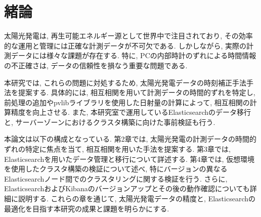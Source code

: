 \chapter{緒論}
\label{chap:first}

太陽光発電は, 再生可能エネルギー源として世界中で注目されており, その効率的な運用と管理には正確な計測データが不可欠である. しかしながら, 実際の計測データには様々な課題が存在する. 特に, PCの内部時計のずれによる時間情報の不正確さは, データの信頼性を損なう重要な問題である.

本研究では, これらの問題に対処するため, 太陽光発電データの時刻補正手法手法を提案する. 具体的には, 相互相関を用いて計測データの時間的ずれを特定し, 前処理の追加やpvlibライブラリを使用した日射量の計算によって, 相互相関の計算精度を向上させる. また, 本研究室で運用しているElasticsearchのデータ移行と, サーバーゾーンにおけるクラスタ構築に向けた事前検証も行う.

本論文は以下の構成となっている. 第2章では, 太陽光発電の計測データの時間的ずれの特定に焦点を当て, 相互相関を用いた手法を提案する. 第3章では, Elasticsearchを用いたデータ管理と移行について詳述する. 第4章では, 仮想環境を使用したクラスタ構築の検証について述べ, 特にバージョンの異なるElasticsearchノード間でのクラスタリングに関する検証を行う. さらに, ElasticsearchおよびKibanaのバージョンアップとその後の動作確認についても詳細に説明する. これらの章を通じて, 太陽光発電データの精度と, Elasticsearchの最適化を目指す本研究の成果と課題を明らかにする.